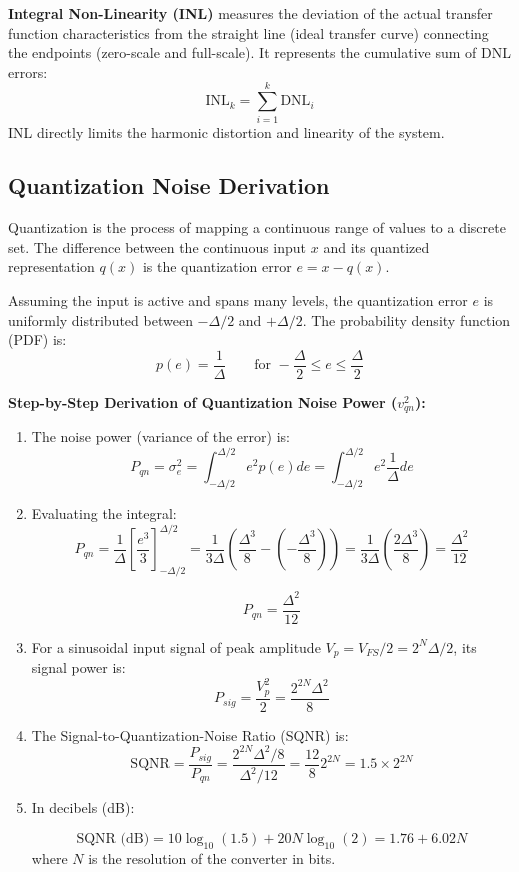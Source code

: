 \documentclass[12pt,a4paper]{article}
\begin{document}
\begin{tcolorbox}[defbox, title={\textbf{Integral Non-Linearity (INL)}}]
\textbf{Integral Non-Linearity (INL)} measures the deviation of the actual transfer function characteristics from the straight line (ideal transfer curve) connecting the endpoints (zero-scale and full-scale). It represents the cumulative sum of DNL errors:
\[
\text{INL}_k = \sum_{i=1}^{k} \text{DNL}_i
\]
INL directly limits the harmonic distortion and linearity of the system.
\end{tcolorbox}

\subsection{Quantization Noise Derivation}
Quantization is the process of mapping a continuous range of values to a discrete set. The difference between the continuous input $x$ and its quantized representation $q(x)$ is the quantization error $e = x - q(x)$.

Assuming the input is active and spans many levels, the quantization error $e$ is uniformly distributed between $-\Delta/2$ and $+\Delta/2$. The probability density function (PDF) is:
\[
p(e) = \frac{1}{\Delta} \qquad \text{for } -\frac{\Delta}{2} \le e \le \frac{\Delta}{2}
\]

\textbf{Step-by-Step Derivation of Quantization Noise Power ($v_{qn}^2$):}
\begin{enumerate}[label=\textbf{\arabic*.}, leftmargin=*, itemsep=3.5pt]
  \item The noise power (variance of the error) is:
  \[
  P_{qn} = \sigma_e^2 = \int_{-\Delta/2}^{\Delta/2} e^2 p(e) de = \int_{-\Delta/2}^{\Delta/2} e^2 \frac{1}{\Delta} de
  \]
  \item Evaluating the integral:
  \[
  P_{qn} = \frac{1}{\Delta} \left[ \frac{e^3}{3} \right]_{-\Delta/2}^{\Delta/2} = \frac{1}{3\Delta} \left( \frac{\Delta^3}{8} - \left(-\frac{\Delta^3}{8}\right) \right) = \frac{1}{3\Delta} \left( \frac{2\Delta^3}{8} \right) = \frac{\Delta^2}{12}
  \]
  \begin{tcolorbox}[formulabox, title={\textbf{Quantization Noise Power}}]
  \[
  P_{qn} = \frac{\Delta^2}{12}
  \]
  \end{tcolorbox}
  \item For a sinusoidal input signal of peak amplitude $V_p = V_{FS}/2 = 2^N \Delta/2$, its signal power is:
  \[
  P_{sig} = \frac{V_p^2}{2} = \frac{2^{2N} \Delta^2}{8}
  \]
  \item The Signal-to-Quantization-Noise Ratio (SQNR) is:
  \[
  \text{SQNR} = \frac{P_{sig}}{P_{qn}} = \frac{2^{2N} \Delta^2 / 8}{\Delta^2 / 12} = \frac{12}{8} 2^{2N} = 1.5 \times 2^{2N}
  \]
  \item In decibels (dB):
  \begin{tcolorbox}[formulabox, title={\textbf{Ideal SQNR Equation}}]
  \[
  \text{SQNR (dB)} = 10 \log_{10}(1.5) + 20 N \log_{10}(2) = 1.76 + 6.02 N
  \]
  where $N$ is the resolution of the converter in bits.
  \end{tcolorbox}
\end{enumerate}
\end{document}
